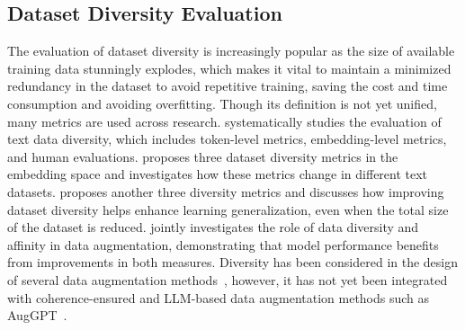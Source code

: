 \subsection{Dataset Diversity Evaluation}
\vspace{-0.1cm}
The evaluation of dataset diversity is increasingly popular as the size of available training data stunningly explodes, which makes it vital to maintain a minimized redundancy in the dataset to avoid repetitive training, saving the cost and time consumption and avoiding overfitting. 
Though its definition is not yet unified, many metrics are used across research. %
\cite{tevet2021evaluating} systematically studies the evaluation of text data diversity, which includes token-level metrics, embedding-level metrics, and human evaluations. 
\cite{lai2020diversity} proposes three dataset diversity metrics in the embedding space and investigates how these metrics change in different text datasets. 
\cite{yu2022can} proposes another three diversity metrics and discusses how improving dataset diversity helps enhance learning generalization, even when the total size of the dataset is reduced.
\cite{gontijo2020affinity} jointly investigates the role of data diversity and affinity in data augmentation, demonstrating that model performance benefits from improvements in both measures. 
Diversity has been considered in the design of several data augmentation methods~\cite{malandrakis2019controlled,liu2021divaug}, however, it has not yet been integrated with coherence-ensured and LLM-based data augmentation methods such as AugGPT~\cite{dai2025auggpt}.